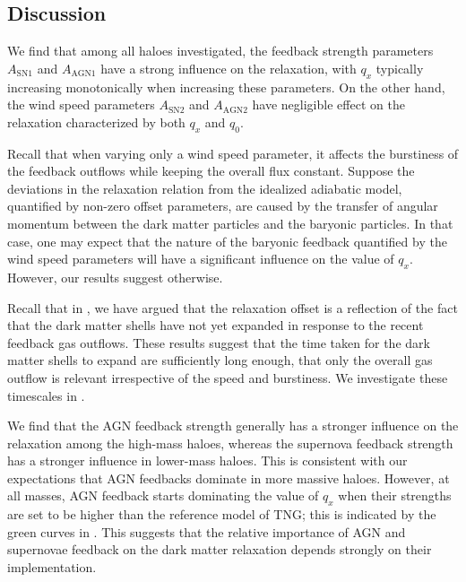 \subsection*{Discussion}

We find that among all haloes investigated, the feedback strength parameters $A_{\mathrm{SN1}}$ and $A_{\mathrm{AGN1}}$ have a strong influence on the relaxation, with $q_x$ typically increasing monotonically when increasing these parameters. On the other hand, 
the wind speed parameters $A_{\mathrm{SN2}}$ and $A_{\mathrm{AGN2}}$ have negligible effect on the relaxation characterized by both $q_x$ and $q_0$.


Recall that when varying only a wind speed parameter, it affects the burstiness of the feedback outflows while keeping the overall flux constant. Suppose the deviations in the relaxation relation from the idealized adiabatic model, quantified by non-zero offset parameters, are caused by the transfer of angular momentum between the dark matter particles and the baryonic particles. In that case, one may expect that the nature of the baryonic feedback quantified by the wind speed parameters will have a significant influence on the value of $q_x$. However, our results suggest otherwise.

Recall that in , we have argued that the relaxation offset is a reflection of the fact that the dark matter shells have not yet expanded in response to the recent feedback gas outflows. These results suggest that the time taken for the dark matter shells to expand are sufficiently long enough, that only the overall gas outflow is relevant irrespective of the speed and burstiness. We investigate these timescales in . 

We find that the AGN feedback strength generally has a stronger influence on the relaxation among the high-mass haloes, whereas the supernova feedback strength has a stronger influence in lower-mass haloes. This is consistent with our expectations that AGN feedbacks dominate in more massive haloes. However, at all masses, AGN feedback starts dominating the value of $q_x$ when their strengths are set to be higher than the reference model of TNG; this is indicated by the green curves in . This suggests that the relative importance of AGN and supernovae feedback on the dark matter relaxation depends strongly on their implementation.

